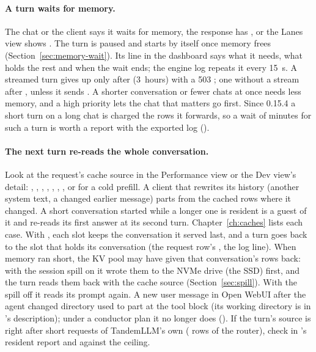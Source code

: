 \paragraph{A turn waits for memory.} The chat or the client says it waits for memory, the response has , or the Lanes view shows . The turn is paused and starts by itself once memory frees (Section~\ref{sec:memory-wait}). Its line in the dashboard says what it needs, what holds the rest and when the wait ends; the engine log repeats it every 15~s. A streamed turn gives up only after  (3~hours) with a 503 ; one without a stream after , unless it sends . A shorter conversation or fewer chats at once needs less memory, and a high priority lets the chat that matters go first. Since 0.15.4 a short turn on a long chat is charged the rows it forwards, so a wait of minutes for such a turn is worth a report with the exported log ().

\paragraph{The next turn re-reads the whole conversation.} Look at the request's cache source in the Performance view or the Dev view's detail: , , , , , , , or  for a cold prefill. A client that rewrites its history (another system text, a changed earlier message) parts from the cached rows where it changed. A short conversation started while a longer one is resident is a guest of it and re-reads its first answer at its second turn. Chapter~\ref{ch:caches} lists each case. With , each slot keeps the conversation it served last, and a turn goes back to the slot that holds its conversation (the request row's , the \code{[parallel]} log line). When memory ran short, the KV pool may have given that conversation's rows back: with the session spill on it wrote them to the NVMe drive (the SSD) first, and the turn reads them back with the cache source  (Section~\ref{sec:spill}). With the spill off it reads its prompt again. A new user message in Open WebUI after the agent changed directory used to part at the tool block (its working directory is in 's description); under a conductor plan it no longer does (). If the turn's source is  right after short requests of TandemLLM's own ( rows of the router), check  in 's resident report and  against the ceiling.

